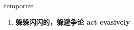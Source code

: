 
\begin{frame}
{\huge temporize}
\begin{center}
\begin{enumerate}\Large
  \item \textbf{躲躲闪闪的，躲避争论 act evasively}
\end{enumerate}
\end{center}
\end{frame}
